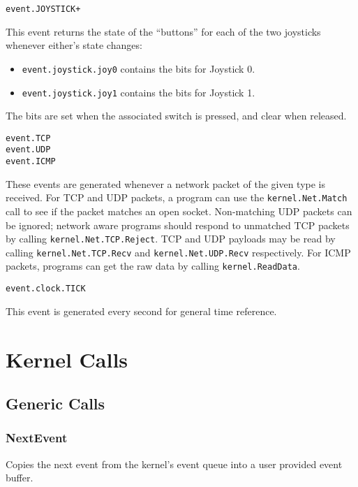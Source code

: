 \begin{verbatim}
event.JOYSTICK+
\end{verbatim}

This event returns the state of the ``buttons'' for each of the two joysticks whenever either's state changes:

\begin{itemize}
\item \verb+event.joystick.joy0+ contains the bits for Joystick 0.
\item \verb+event.joystick.joy1+ contains the bits for Joystick 1.
\end{itemize}

The bits are set when the associated switch is pressed, and clear when released.

\begin{verbatim}
event.TCP
event.UDP
event.ICMP
\end{verbatim}

These events are generated whenever a network packet of the given type is received.  For TCP and UDP packets, a program can use the \verb+kernel.Net.Match+ call to see if the packet matches an open socket.  Non-matching UDP packets can be ignored; network aware programs should respond to unmatched TCP packets by calling \verb+kernel.Net.TCP.Reject+. TCP and UDP payloads may be read by calling \verb+kernel.Net.TCP.Recv+ and \verb+kernel.Net.UDP.Recv+ respectively.  For ICMP packets, programs can get the raw data by calling \verb+kernel.ReadData+.   

\begin{verbatim}
event.clock.TICK
\end{verbatim}

This event is generated every second for general time reference.


\section*{Kernel Calls}

\subsection*{Generic Calls}

\subsubsection*{NextEvent}
Copies the next event from the kernel's event queue into a user provided event buffer.

